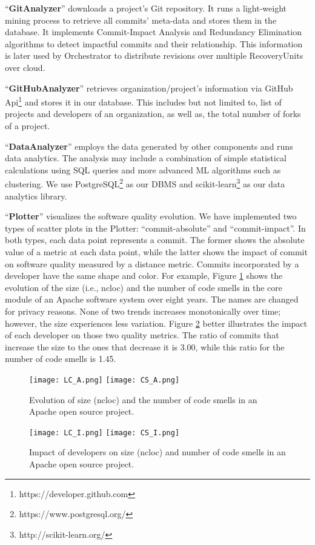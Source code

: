 ``\textbf{GitAnalyzer}'' downloads a project's Git repository.
It runs a light-weight mining process to retrieve all commits' meta-data and stores them in the database.
It implements Commit-Impact Analysis and Redundancy Elimination algorithms \cite{Behnamghader2017qrs} to detect impactful commits and their relationship.
This information is later used by Orchestrator to distribute revisions over multiple RecoveryUnits over cloud.

``\textbf{GitHubAnalyzer}'' retrieves organization/project's information via GitHub Api\footnote{https://developer.github.com} and stores it in our database.
This includes but not limited to, list of projects and developers of an organization, as well as, the total number of forks of a project.

``\textbf{DataAnalyzer}'' employs the data generated by other components and runs data analytics. 
The analysis may include a combination of simple statistical calculations using SQL queries and more advanced ML algorithms such as clustering.
We use PostgreSQL\footnote{https://www.postgresql.org/} as our DBMS and scikit-learn\footnote{http://scikit-learn.org/} as our data analytics library.


``\textbf{Plotter}'' visualizes the software quality evolution.
We have implemented two types of scatter plots in the Plotter: ``commit-absolute'' and ``commit-impact''.
In both types, each data point represents a commit.
The former shows the absolute value of a metric at each data point, while the latter shows the impact of commit on software quality measured by a distance metric.
Commits incorporated by a developer have the same shape and color.
For example, Figure \ref{figure:absolute} shows the evolution of the size (i.e., ncloc) and the number of code smells in the core module of an Apache software system over eight years.
The names are changed for privacy reasons. None of two trends increases monotonically over time; however, the size experiences less variation. 
Figure \ref{figure:impact} better illustrates the impact of each developer on those two quality metrics.
The ratio of commits that increase the size to the ones that decrease it is 3.00, while this ratio for the number of code smells is 1.45.

\begin{figure} [h]
	\centering
	\texttt{[image: LC\_A.png]}
	\texttt{[image: CS\_A.png]}
	\caption{Evolution of size (ncloc) and the number of code smells in an Apache open source project.}
	\label{figure:absolute}
	\vspace{-0.5cm}
\end{figure}


\begin{figure} [h]
	\centering
	\texttt{[image: LC\_I.png]}
	\texttt{[image: CS\_I.png]}
	\caption{Impact of developers on size (ncloc) and number of code smells in an Apache open source project.}
	\label{figure:impact}
	\vspace{-0.5cm}
\end{figure}